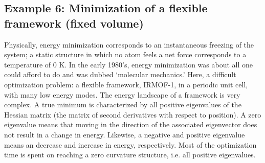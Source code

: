 \subsection*{Example 6: Minimization of a flexible framework (fixed volume)}

Physically, energy minimization corresponds to an instantaneous freezing of the system; a static structure in
which no atom feels a net force corresponds to a temperature of 0 K. In the early 1980's, energy minimization was
about all one could afford to do and was dubbed `molecular mechanics.' Here, a difficult optimization problem:
a flexible framework, IRMOF-1, in a periodic unit cell, with many low energy modes.
The energy landscape of a framework is very complex. A true minimum is characterized by
all positive eigenvalues of the Hessian matrix (the matrix of second derivatives with respect to position). A
zero eigenvalue means that moving in the direction of the associated eigenvector does not result in a change in
energy. Likewise, a negative and positive eigenvalue means an decrease and increase in energy, respectively.
Most of the optimization time is spent on reaching a zero curvature structure, i.e. all positive eigenvalues.

